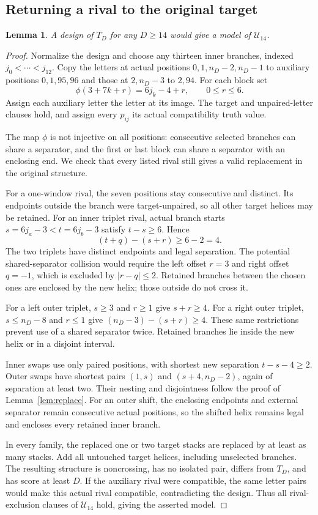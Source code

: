 \documentclass[11pt,a4paper]{article}
\newtheorem{lemma}[theorem]{Lemma}
\theoremstyle{definition}
\newcommand{\U}{\mathcal U_{14}}
\begin{document}
\subsection{Returning a rival to the original target}\label{sec:embedding}
\begin{lemma}\label{lem:embedding}
A design of $T_D$ for any $D\geq14$ would give a model of $\U$.
\end{lemma}
\begin{proof}
Normalize the design and choose any thirteen inner branches, indexed
$j_0<\cdots<j_{12}$. Copy the letters at actual positions
$0,1,n_D-2,n_D-1$ to auxiliary positions $0,1,95,96$ and those at
$2,n_D-3$ to $2,94$. For each block set
\begin{equation}\label{eq:map}
 \phi(3+7k+r)=6j_k-4+r,\qquad 0\leq r\leq6.
\end{equation}
Assign each auxiliary letter the letter at its image. The target and
unpaired-letter clauses hold, and assign every $p_{ij}$ its actual
compatibility truth value.

The map $\phi$ is not injective on all positions: consecutive selected
branches can share a separator, and the first or last block can share
a separator with an enclosing end. We check that every listed rival
still gives a valid replacement in the original structure.

For a one-window rival, the seven positions stay consecutive and
distinct. Its endpoints outside the branch were target-unpaired, so
all other target helices may be retained. For an inner triplet rival,
actual branch starts $s=6j_a-3<t=6j_b-3$ satisfy $t-s\geq6$. Hence
\[
 (t+q)-(s+r)\geq6-2=4.
\]
The two triplets have distinct endpoints and legal separation. The
potential shared-separator collision would require the left offset
$r=3$ and right offset $q=-1$, which is excluded by $|r-q|\leq2$.
Retained branches between the chosen ones are enclosed by the new
helix; those outside do not cross it.

For a left outer triplet, $s\geq3$ and $r\geq1$ give
$s+r\geq4$. For a right outer triplet, $s\leq n_D-8$ and $r\leq1$
give $(n_D-3)-(s+r)\geq4$. These same restrictions prevent use of a
shared separator twice. Retained branches lie inside the new helix or
in a disjoint interval.

Inner swaps use only paired positions, with shortest new separation
$t-s-4\geq2$. Outer swaps have shortest pairs $(1,s)$ and
$(s+4,n_D-2)$, again of separation at least two. Their nesting and
disjointness follow the proof of Lemma~\ref{lem:replace}.
For an outer shift, the enclosing endpoints and external separator
remain consecutive actual positions, so the shifted helix remains
legal and encloses every retained inner branch.

In every family, the replaced one or two target stacks are replaced
by at least as many stacks. Add all untouched target helices, including
unselected branches. The resulting structure is noncrossing, has no
isolated pair, differs from $T_D$, and has score at least $D$.
If the auxiliary rival were compatible, the same letter pairs would
make this actual rival compatible, contradicting the design. Thus all
rival-exclusion clauses of $\U$ hold, giving the asserted model.
\end{proof}
\end{document}
